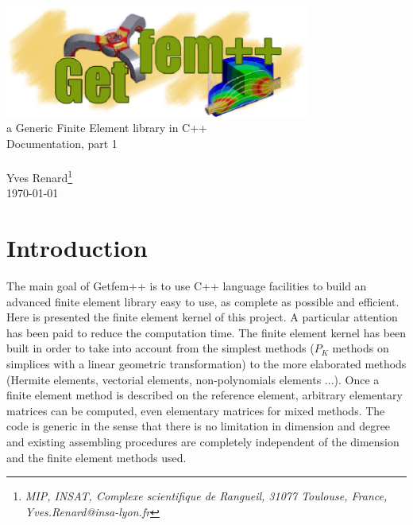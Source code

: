 \documentclass[11pt,a4paper]{article}
\begin{document}
\begin{center}
  \includegraphics[width=10cm,angle=0]{getfem_logo.eps}\\[0.2cm]
  a Generic Finite Element library in C++ \\[0.5cm]
  {\LARGE Documentation, part \Huge 1} \\[0.5cm]
   \\[0.5cm]
  { \large Yves \sc Renard\footnote{ \it MIP, INSAT, Complexe scientifique de Rangueil, 31077 Toulouse, France, Yves.Renard@insa-lyon.fr } } \\[1.0cm]
      \today \\[1.0cm]
\end{center}




\section*{Introduction}
The main goal of {\sc Getfem++} is to use C++ language facilities to build an advanced finite element library easy to use, as complete as possible and efficient. Here is presented the finite element kernel of this project. A particular attention has been paid to reduce the computation time. The finite element kernel has been built in order to take into account from the simplest methods ($P_K$ methods on simplices with a linear geometric transformation) to the more elaborated methods (Hermite elements, vectorial elements, non-polynomials elements ...). Once a finite element method is described on the reference element, arbitrary elementary  matrices can be computed, even elementary matrices for mixed methods. The code is generic in the sense that there is no limitation in dimension and degree and existing assembling procedures are completely independent of the dimension and the finite element methods used.\\[1.4cm]

\end{document}
